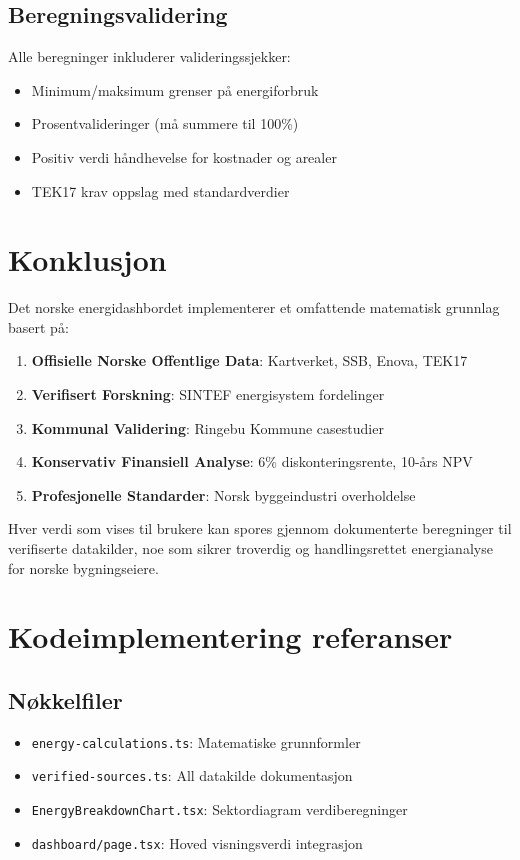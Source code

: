 \documentclass[12pt,a4paper]{article}
\begin{document}
\subsection{Beregningsvalidering}

Alle beregninger inkluderer valideringssjekker:

\begin{itemize}
\item Minimum/maksimum grenser på energiforbruk
\item Prosentvalideringer (må summere til 100\%)
\item Positiv verdi håndhevelse for kostnader og arealer
\item TEK17 krav oppslag med standardverdier
\end{itemize}

\section{Konklusjon}

Det norske energidashbordet implementerer et omfattende matematisk grunnlag basert på:

\begin{enumerate}
\item \textbf{Offisielle Norske Offentlige Data}: Kartverket, SSB, Enova, TEK17
\item \textbf{Verifisert Forskning}: SINTEF energisystem fordelinger
\item \textbf{Kommunal Validering}: Ringebu Kommune casestudier
\item \textbf{Konservativ Finansiell Analyse}: 6\% diskonteringsrente, 10-års NPV
\item \textbf{Profesjonelle Standarder}: Norsk byggeindustri overholdelse
\end{enumerate}

Hver verdi som vises til brukere kan spores gjennom dokumenterte beregninger til verifiserte datakilder, noe som sikrer troverdig og handlingsrettet energianalyse for norske bygningseiere.

\appendix

\section{Kodeimplementering referanser}

\subsection{Nøkkelfiler}
\begin{itemize}
\item \texttt{energy-calculations.ts}: Matematiske grunnformler
\item \texttt{verified-sources.ts}: All datakilde dokumentasjon
\item \texttt{EnergyBreakdownChart.tsx}: Sektordiagram verdiberegninger
\item \texttt{dashboard/page.tsx}: Hoved visningsverdi integrasjon
\end{itemize}
\end{document}
